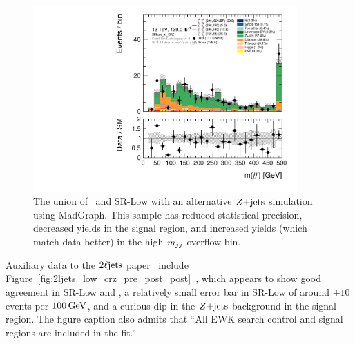 \begin{figure}[tp]
\centering
\includegraphics[width=0.9\textwidth]{figures/2ljets_low_mjj_SRLow_or_CRZ_mg5.pdf}
\caption[
The union of CR-Z and SR-Low with an alternative $\zjets$ simulation using
MadGraph
]{%
The union of \crz\ and SR-Low with an alternative $\zjets$ simulation using
MadGraph.
This sample has reduced statistical precision, decreased yields in the signal
region, and increased yields (which match data better) in the high-$\mjj$
overflow bin.
}
\label{fig:2ljets_low_sr_or_cr_region_alt}
\end{figure}

Auxiliary data to the $\twoljets$ paper~\cite{atlas2022searches} include
Figure~\ref{fig:2ljets_low_crz_pre_post_post}~\cite{hepdata.116034.v1/t101},
which appears to show good agreement in SR-Low and \crz, a relatively
small error bar in SR-Low of around $\pm10$ events per $100\,\eV[G]$,
and a curious dip in the $\zjets$ background in the signal region.
The figure caption also admits that
``All EWK search control and signal regions are included in the fit.''

